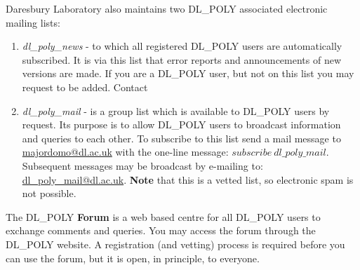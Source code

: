 \noindent
Daresbury Laboratory also maintains two DL\_POLY associated electronic
mailing lists:
\begin{enumerate}
\item {\em dl\_poly\_news} - to which all registered DL\_POLY users
are automatically subscribed.  It is via this list that error reports
and announcements of new versions are made.  If you are a DL\_POLY
user, but not on this list you may request to be added.  Contact \\
\item {\em dl\_poly\_mail} - is a group list which is available to
DL\_POLY users by request.  Its purpose is to allow DL\_POLY users
to broadcast information and queries to each other.
To subscribe to this list send a mail message to
{\href{mailto:majordomo@dl.ac.uk}{majordomo@dl.ac.uk}}
with the one-line message: $subscribe~dl\_poly\_mail$.
Subsequent messages may be broadcast by e-mailing to:
{\href{mailto:dl\_poly\_mail@dl.ac.uk}{dl\_poly\_mail@dl.ac.uk}}.
{\bf Note} that this is a vetted list, so electronic spam is not possible.
\end{enumerate}

The DL\_POLY {\bf Forum} is a web based centre for all DL\_POLY users
to exchange comments and queries.  You may access the forum through the
DL\_POLY website.  A registration (and vetting) process is required
before you can use the forum, but it is open, in principle, to everyone.

